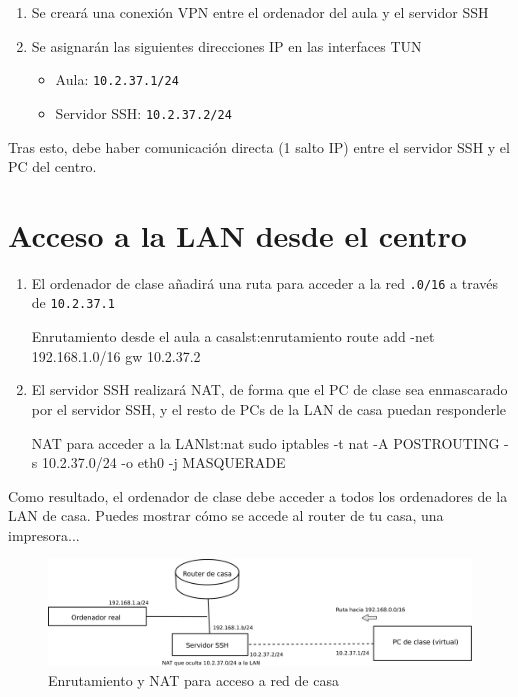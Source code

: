 \begin{enumerate}
\item Se creará una conexión VPN entre el ordenador del aula y el servidor SSH
\item Se asignarán las siguientes direcciones IP en las interfaces TUN
  \begin{itemize}
  \item Aula: \texttt{10.2.37.1/24}
  \item Servidor SSH: \texttt{10.2.37.2/24}
  \end{itemize}
\end{enumerate}

Tras esto, debe haber comunicación directa (1 salto IP) entre el servidor SSH y el PC del centro.


\section{Acceso a la LAN desde el centro}
\begin{enumerate}
\item El ordenador de clase añadirá una ruta para acceder a la red \texttt{\reddecasa.0/16} a través de \texttt{10.2.37.1}

  \begin{listadoshell}{Enrutamiento desde el aula a casa}{lst:enrutamiento}
    route add -net 192.168.1.0/16 gw 10.2.37.2
  \end{listadoshell}
  
\item El servidor SSH realizará NAT, de forma que el PC de clase sea enmascarado por el servidor SSH, y el resto de PCs de la LAN de casa puedan responderle
  
  \begin{listadoshell}{NAT para acceder a la LAN}{lst:nat}
    sudo iptables -t nat -A POSTROUTING -s 10.2.37.0/24 -o eth0 -j MASQUERADE
  \end{listadoshell}
  

\end{enumerate}

Como resultado, el ordenador de clase debe acceder a todos los ordenadores de la LAN de casa. Puedes mostrar cómo se accede al router de tu casa, una impresora...

\begin{figure}[h]
  \begin{center}
    \includegraphics[width=.9\textwidth]{./media/practica-vpn-nat.pdf}
  \end{center}
  \caption{Enrutamiento y NAT para acceso a red de casa}\label{fig:enrutamiento-y-nat}
\end{figure}

